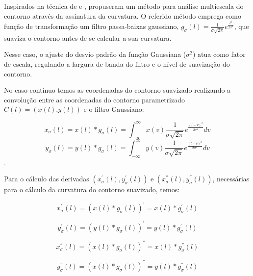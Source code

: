 Inspirados na técnica de  e ,  propuseram um método para análise multiescala do contorno através da assinatura da curvatura. O referido método emprega como função de transformação um filtro passa-baixas gaussiano, $g_{\sigma}(l) = \frac{1}{\sigma\sqrt{2\pi}}e^{\frac{l^2}{2\sigma^2}}$, que suaviza o contorno antes de se calcular a sua curvatura. 

Nesse caso, o ajuste do desvio padrão da função Gaussiana ($\sigma^2$) atua como fator de escala, regulando a largura de banda do filtro e o nível de suavização do contorno.


No caso contínuo temos as coordenadas do contorno suavizado realizando a convolução entre as coordenadas do contorno parametrizado $C(l) = (x(l)\text{,}y(l))$ e o filtro Gaussiano:  

\begin{equation}
x_{\sigma}(l) = x(l) * g_{\sigma}(l) = \int^{\infty}_{-\infty}{x(v)\frac{1}{\sigma\sqrt{2\pi}}e^{\frac{(l-v)^2}{2\sigma^2}}}dv
\end{equation}
\begin{equation}
y_{\sigma}(l) = y(l) * g_{\sigma}(l)=\int^{\infty}_{-\infty}{y(v)\frac{1}{\sigma\sqrt{2\pi}}e^{\frac{(l-v)^2}{2\sigma^2}}}dv
\end{equation}.

Para o cálculo das derivadas $(x^{'}_{\sigma}(l),y^{'}_{\sigma}(l))$ e $(x^{''}_{\sigma}(l),y^{''}_{\sigma}(l))$, necessárias para o cálculo da curvatura do contorno suavizado, temos:

\begin{equation}
x^{'}_{\sigma}(l) = (x(l) * g_{\sigma}(l))^{'} = x(l) * g^{'}_{\sigma}(l)
\end{equation}

\begin{equation}
y^{'}_{\sigma}(l) = (y(l) * g_{\sigma}(l))^{'} = y(l) * g^{'}_{\sigma}(l)
\end{equation}

\begin{equation}
x^{''}_{\sigma}(l) = (x(l) * g_{\sigma}(l))^{''} = x(l) * g^{''}_{\sigma}(l)
\end{equation}

\begin{equation}
y^{''}_{\sigma}(l) = (x(l) * g_{\sigma}(l))^{''} = y(l) * g^{''}_{\sigma}(l)
\end{equation}

